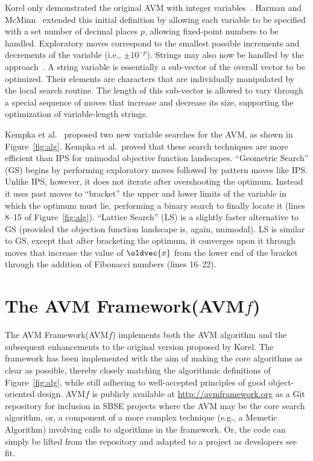 \documentclass{llncs}
\let\vec\oldvec %
\newcommand{\longname}{AVM Framework\xspace}
\newcommand{\name}{\mbox{AVM\hspace{-1pt}$f$}\xspace}
\newcommand{\repourl}{\url{http://avmframework.org}\xspace}
\newcommand{\inlineheading}[1]{\vspace{1mm} \noindent {\bf #1.}}
\begin{document}
\inlineheading{New Representations} Korel only demonstrated the original AVM with integer variables~\cite{Korel1990}.  Harman and McMinn~\cite{Harman2007} extended this initial definition by allowing each variable to be specified with a set number of decimal places $p$, allowing fixed-point numbers to be handled. Exploratory moves correspond to the smallest possible increments and decrements of the variable (i.e., $\pm10^{-p}$). Strings may also now be handled by the approach~\cite{Kapfhammer2013,McMinn2015}. A string variable is essentially a sub-vector of the overall vector to be optimized. Their elements are characters that are individually manipulated by the local search routine. The length of this sub-vector is allowed to vary through a special sequence of moves that increase and decrease its size, supporting the optimization of variable-length strings.

\inlineheading{New Variable Search Algorithms}
Kempka et al.~\cite{Kempka2013,Kempka2015} proposed two new variable searches for the AVM, as shown in Figure~\ref{fig:alg}. Kempka et al.\ proved that these search techniques are more efficient than IPS for unimodal objective function landscapes. ``Geometric Search'' (GS) begins by performing exploratory moves followed by pattern moves like IPS. Unlike IPS, however, it does not iterate after overshooting the optimum. Instead it uses past moves to  ``bracket'' the upper and lower limits of the variable in which the optimum must lie, performing a binary search to finally locate it (lines 8--15 of Figure~\ref{fig:alg}). ``Lattice Search'' (LS) is a slightly faster alternative to GS (provided the objection function landscape is, again, unimodal). LS is similar to GS, except that after bracketing the optimum, it converges upon it through moves that increase the value of $\vec{x}$ from the lower end of the bracket through the addition of Fibonacci numbers (lines 16--22).

\vspace{-1em}
\section{The \longname (\name)}
\vspace{-1em}
\label{sec:avmf}

The \longname (\name) implements both the AVM algorithm and the subsequent enhancements to the original version proposed by Korel. The framework has been implemented with the aim of making the core algorithms as clear as possible, thereby closely matching the algorithmic definitions of Figure~\ref{fig:alg}, while still adhering to well-accepted principles of good object-oriented design. \name is publicly available at \repourl as a Git repository for inclusion in SBSE projects where the AVM may be the core search algorithm, or, a component of a more complex technique (e.g., a Memetic Algorithm) involving calls to algorithms in the framework. Or, the code can simply be lifted from the repository and adapted to a project as developers see fit.
\end{document}
